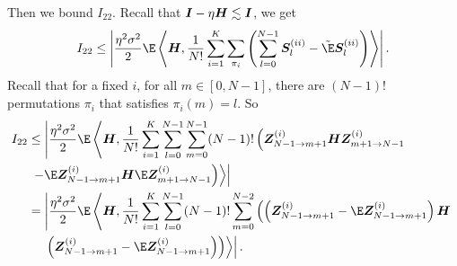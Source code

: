 Then we bound $I_{22}$. Recall that ${\bm{I}}-\eta{\bm{H}}\lesssim{\bm{I}}$, we get  
\begin{align*}
    I_{22}
    &\leq \left|\frac{\eta^2\sigma^2}{2}\E\inp{\mH}{\frac{1}{N!}\sum_{i=1}^K\sum_{\pi_i}\left(\sum_{l=0}^{N-1}\mS_l^{(ii)}-\fakeE \mS_l^{(ii)}\right)}\right|. \\
\end{align*}
Recall that for a fixed $i$, for all $m\in[0,N-1]$, there are $(N-1)!$ permutations $\pi_i$ that satisfies $\pi_i(m)=l$. So
\begin{align*}
    I_{22}
    &\leq \left|\frac{\eta^2\sigma^2}{2}\E\left\langle \mH, \frac{1}{N!}\sum_{i=1}^K\sum_{l=0}^{N-1}\sum_{m=0}^{N-1}(N-1)!\left(\mZ_{N-1 \to m+1}^{(i)}\mH\mZ_{m+1 \to N-1}^{(i)}\right.\right.\right. \\
    &\left.\left.\left.-\E\mZ_{N-1 \to m+1}^{(i)}\mH\E\mZ_{m+1 \to N-1}^{(i)}\right)\right\rangle\right| \\
    &= \left|\frac{\eta^2\sigma^2}{2}\E\left\langle \mH, \frac{1}{N!}\sum_{i=1}^K\sum_{l=0}^{N-1}(N-1)!\sum_{m=0}^{N-2}\left(\left(\mZ_{N-1 \to m+1}^{(i)}-\E\mZ_{N-1 \to m+1}^{(i)}\right)\mH\right.\right.\right. \\
    &\quad \left.\left. \left.\left(\mZ_{N-1 \to m+1}^{(i)}-\E\mZ_{N-1 \to m+1}^{(i)}\right)\right)\right\rangle\right|. \\
\end{align*}

